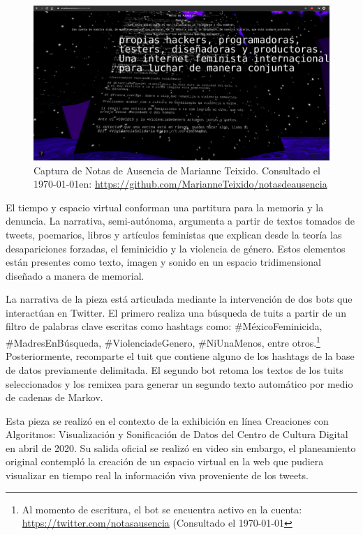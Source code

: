 \begin{figure}[tb]
\centering 
\includegraphics[width=\columnwidth]{../img/notas02.png} 
\caption[Notas de Ausencia - Marianne Teixido]{Captura de Notas de Ausencia de Marianne Teixido. Consultado el \today en: \url{https://github.com/MarianneTeixido/notasdeausencia}} %
\label{fig:gallery} 
\end{figure}

El tiempo y espacio virtual conforman una partitura para la memoria y la denuncia. La narrativa, semi-autónoma, argumenta a partir de textos tomados de tweets, poemarios, libros y artículos feministas que explican desde la teoría las desapariciones forzadas, el feminicidio y la violencia de género. Estos elementos están presentes como texto, imagen y sonido en un espacio tridimensional diseñado a manera de memorial.

La narrativa de la pieza está articulada mediante la intervención de dos bots que interactúan en Twitter. El primero realiza una búsqueda de tuits a partir de un filtro de palabras clave escritas como hashtags como: \#MéxicoFeminicida, \#MadresEnBúsqueda, \#ViolenciadeGenero, \#NiUnaMenos, entre otros.\footnote{Al momento de escritura, el bot se encuentra activo en la cuenta: \url{https://twitter.com/notasausencia} (Consultado el \today} Posteriormente, recomparte el tuit que contiene alguno de los hashtags de la base de datos previamente delimitada. El segundo bot retoma los textos de los tuits seleccionados y los remixea para generar un segundo texto automático por medio de cadenas de Markov.

Esta pieza se realizó en el contexto de la exhibición en línea Creaciones con Algoritmos: Visualización y Sonificación de Datos del Centro de Cultura Digital en abril de 2020. Su salida oficial se realizó en video sin embargo, el planeamiento original contempló la creación de un espacio virtual en la web que pudiera visualizar en tiempo real la información viva proveniente de los tweets.

